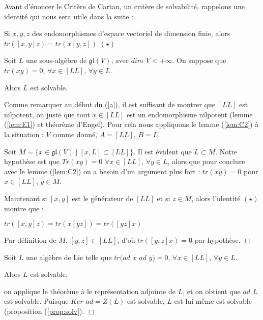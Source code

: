 \documentclass[a4paper,openany,12pt]{report}
\newcommand{\gl}{\mathfrak{gl}}
\theoremstyle{break}
{\theorembodyfont{\upshape}
\newtheorem*{rmq}{Remarque :}
\newtheorem*{prv}{Preuve :}
\newtheorem*{ex}{Exemples :}
\newtheorem*{exe}{Exemple : }
\newtheorem*{nota}{Notation :}
\newtheorem*{dem}{D\'emonstration :}}
\begin{document}
Avant d'énoncer le Critère de Cartan, un critère de solvabilité, rappelons une identité qui nous sera utile dans la suite : 
\begin{center}
Si $x,y,z$ des endomorphismes d'espace vectoriel de dimension finie, alors $tr([x,y]z)=tr(x[y,z])$ $(\star)$
\end{center}

\begin{thm}\label{th:cartan}
Soit $L$ une sous-algèbre de $\gl(V)$, avec $dim$ $V<+\infty$. On suppose que $tr(xy)=0$, $\forall x \in [LL]$, $\forall y \in L$.

Alors $L$ est solvable. 
\end{thm}

\begin{dem}
\quad Comme remarquer au début du (\ref{a}), il est suffisant de montrer que $[LL]$ est nilpotent, ou juste que tout $x \in [LL]$ est un endomorphisme nilpotent (lemme (\ref{lem:E1}) et théorème d'Engel). Pour cela nous appliquons le lemme (\ref{lem:C2}) à la situation : $V$ comme donné, $A=[LL]$, $B=L$.

Soit $M= \{ x \in \gl(V) \mid [x,L] \subset [LL] \}$. Il est évident que $L \subset M$. Notre hypothèse est que $Tr(xy)=0$ $\forall x \in [LL]$, $\forall y \in L$, alors que pour conclure avec le lemme (\ref{lem:C2}) on a besoin d'un argument plus fort : \quad $tr(xy)=0$ pour $x \in [LL]$, $y \in M$.

Maintenant si $[x,y]$ est le générateur de $[LL]$ et si $z \in M$, alors l'identité $(\star)$ montre que :
\begin{center}
$tr([x,y]z)=tr(x[yz])=tr([yz]x)$
\end{center}
Par définition de $M$, $[y,z] \in [LL]$, d'où $tr([y,z]x)=0$ par hypothèse. $\Box$
\end{dem}

\begin{cor}
\quad Soit $L$ une algèbre de Lie telle que $tr(ad$ $x$ $ad$ $y) = 0$, $\forall x \in [LL]$, $\forall y \in  L$.

Alors $L$ est solvable.
\end{cor}

\begin{prv}
\quad on applique le théorème à le représentation adjointe de $L$, et on obtient que $ad$ $L$ est solvable. Puisque $Ker$ $ad = Z(L)$ est solvable, $L$ est lui-même est solvable (proposition (\ref{prop:solv}). $\Box$
\end{prv}
\end{document}

